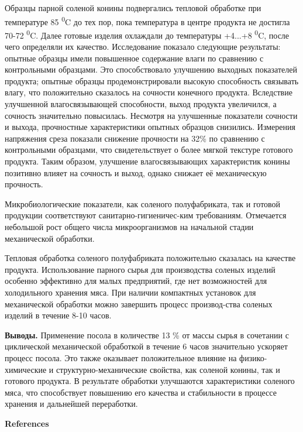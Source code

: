 \begin{multicols}{2}
Образцы парной соленой конины подвергались тепловой обработке при
температуре 85 \textsuperscript{0}C до тех пор, пока температура в
центре продукта не достигла 70-72 \textsuperscript{0}C. Далее готовые
изделия охлаждали до температуры +4...+8 \textsuperscript{0}C, после
чего определяли их качество. Исследование показало следующие результаты:
опытные образцы имели повышенное содержание влаги по сравнению с
контрольными образцами. Это способствовало улучшению выходных
показателей продукта; опытные образцы продемонстрировали высокую
способность связывать влагу, что положительно сказалось на сочности
конечного продукта. Вследствие улучшенной влагосвязывающей способности,
выход продукта увеличился, а сочность значительно повысилась. Несмотря
на улучшенные показатели сочности и выхода, прочностные характеристики
опытных образцов снизились. Измерения напряжения среза показали снижение
прочности на 32\% по сравнению с контрольными образцами, что
свидетельствует о более мягкой текстуре готового продукта. Таким
образом, улучшение влагосвязывающих характеристик конины позитивно
влияет на сочность и выход, однако снижает её механическую прочность.

Микробиологические показатели, как соленого полуфабриката, так и готовой
продукции соответствуют санитарно-гигиеничес-ким требованиям. Отмечается
небольшой рост общего числа микроорганизмов на начальной стадии
механической обработки.

Тепловая обработка соленого полуфабриката положительно сказалась на
качестве продукта. Использование парного сырья для производства соленых
изделий особенно эффективно для малых предприятий, где нет возможностей
для холодильного хранения мяса. При наличии компактных установок для
механической обработки можно завершить процесс производ-ства соленых
изделий в течение 8-10 часов.

{\bfseries Выводы.} Применение посола в количестве 13 \% от массы сырья в
сочетании с циклической механической обработкой в течение 6 часов
значительно ускоряет процесс посола. Это также оказывает положительное
влияние на физико-химические и структурно-механические свойства, как
соленой конины, так и готового продукта. В результате обработки
улучшаются характеристики соленого мяса, что способствует повышению его
качества и стабильности в процессе хранения и дальнейшей переработки.
\end{multicols}

\begin{center}
  {\bfseries References}
  \end{center}

